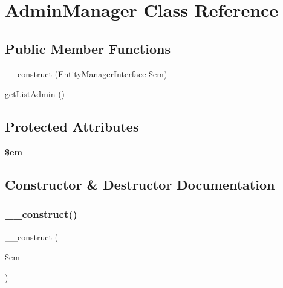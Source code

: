 \hypertarget{class_app_1_1_b_l_1_1_admin_manager}{}\section{Admin\+Manager Class Reference}
\label{class_app_1_1_b_l_1_1_admin_manager}
\subsection*{Public Member Functions}
\begin{DoxyCompactItemize}
\item 
\mbox{\hyperlink{class_app_1_1_b_l_1_1_admin_manager_a25f4258aeb5ce2a61a2504cb7c058485}{\+\_\+\+\_\+construct}} (Entity\+Manager\+Interface \$em)
\item 
\mbox{\hyperlink{class_app_1_1_b_l_1_1_admin_manager_aec8ce9ecee7a9381b110b6bb111cb2e3}{get\+List\+Admin}} ()
\end{DoxyCompactItemize}
\subsection*{Protected Attributes}
\begin{DoxyCompactItemize}
\item 
\mbox{\label{class_app_1_1_b_l_1_1_admin_manager_a0f2991d5fed029ef50ef619f1a532d06}} 
{\bfseries \$em}
\end{DoxyCompactItemize}


\subsection{Constructor \& Destructor Documentation}
\mbox{\label{class_app_1_1_b_l_1_1_admin_manager_a25f4258aeb5ce2a61a2504cb7c058485}} 
\subsubsection{\texorpdfstring{\_\_construct()}{\_\_construct()}}
{\footnotesize\ttfamily \+\_\+\+\_\+construct (\begin{DoxyParamCaption}\item[{Entity\+Manager\+Interface}]{\$em }\end{DoxyParamCaption})}

